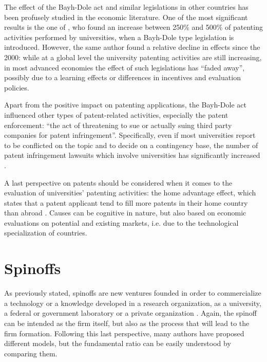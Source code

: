 The effect of the Bayh-Dole act and similar legislations in other countries has been profusely studied in the economic literature. One of the most significant results is the one of \citet{Leydesdorff2010}, who found an increase between 250\% and 500\% of patenting activities performed by universities, when a Bayh-Dole type legislation is introduced. However, the same author found a relative decline in effects since the 2000: while at a global level the university patenting activities are still increasing, in most advanced economies the effect of such legislations has \enquote{faded away}, possibly due to a learning effects or differences in incentives and evaluation policies.

Apart from the positive impact on patenting applications, the Bayh-Dole act influenced other types of patent-related activities, especially the patent enforcement: \enquote{the act of threatening to sue or actually suing third party companies for patent infringement}. Specifically, even if most universities report to be conflicted on the topic and to decide on a contingency base, the number of patent infringement lawsuits which involve universities has significantly increased \citep{Hayter2016}.

A last perspective on patents should be considered when it comes to the evaluation of universities' patenting activities: the home advantage effect, which states that a patent applicant tend to fill more patents in their home country than abroad \citep{Criscuolo2005}. Causes can be cognitive in nature, but also based on economic evaluations on potential and existing markets, i.e. due to the technological specialization of countries.

\section{Spinoffs}

As previously stated, spinoffs are new ventures founded in order to commercialize a technology or a knowledge developed in a research organization, as a university, a federal or government laboratory or a private organization \citep{Rogers2001}. Again, the spinoff can be intended as the firm itself, but also as the process that will lead to the firm formation. Following this last perspective, many authors have proposed different models, but the fundamental ratio can be easily understood by comparing them.

